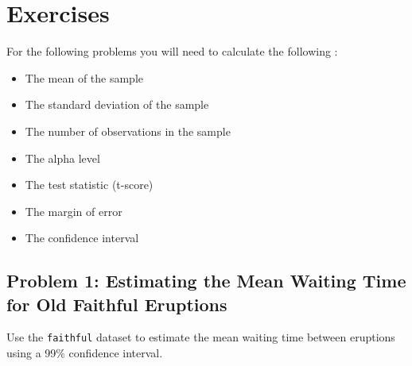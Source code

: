 \documentclass[
  letterpaper,
  DIV=11,
  numbers=noendperiod]{scrreprt}
\providecommand{\tightlist}{%
  \setlength{\itemsep}{0pt}\setlength{\parskip}{0pt}}\usepackage{longtable,booktabs,array}
\begin{document}
\section*{Exercises}\label{exercises-17}


For the following problems you will need to calculate the following :

\begin{itemize}
\tightlist
\item
  The mean of the sample
\item
  The standard deviation of the sample
\item
  The number of observations in the sample
\item
  The alpha level
\item
  The test statistic (t-score)
\item
  The margin of error
\item
  The confidence interval
\end{itemize}

\subsection*{Problem 1: Estimating the Mean Waiting Time for Old
Faithful
Eruptions}\label{problem-1-estimating-the-mean-waiting-time-for-old-faithful-eruptions}

Use the \texttt{faithful} dataset to estimate the mean waiting time
between eruptions using a 99\% confidence interval.
\end{document}
